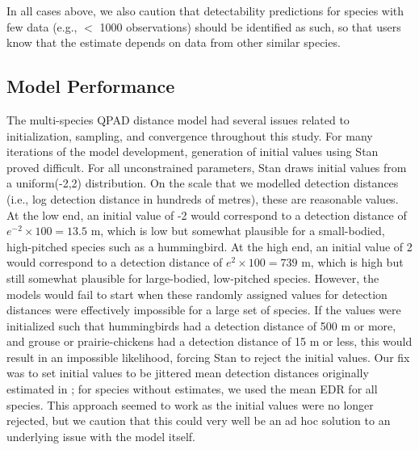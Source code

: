 \documentclass[12pt]{article}
\begin{document}
In all cases above, we also caution that detectability predictions for species with few data (e.g., $<$ 1000 observations) should be identified as such, so that users know that the estimate depends on data from other similar species.


\subsection{Model Performance}

\par The multi-species QPAD distance model had several issues related to initialization, sampling, and convergence throughout this study.
For many iterations of the model development, generation of initial values using Stan proved difficult.
For all unconstrained parameters, Stan draws initial values from a uniform(-2,2) distribution.
On the scale that we modelled detection distances (i.e., log detection distance in hundreds of metres), these are reasonable values.
At the low end, an initial value of -2 would correspond to a detection distance of $e^{-2} \times 100 = 13.5$ m, which is low but somewhat plausible for a small-bodied, high-pitched species such as a hummingbird.
At the high end, an initial value of 2 would correspond to a detection distance of $e^{2} \times 100 = 739$ m, which is high but still somewhat plausible for large-bodied, low-pitched species.
However, the models would fail to start when these randomly assigned values for detection distances were effectively impossible for a large set of species.
If the values were initialized such that hummingbirds had a detection distance of 500 m or more, and grouse or prairie-chickens had a detection distance of 15 m or less, this would result in an impossible likelihood, forcing Stan to reject the initial values.
Our fix was to set initial values to be jittered mean detection distances originally estimated in \citet{edwards_point_2023}; for species without estimates, we used the mean EDR for all species.
This approach seemed to work as the initial values were no longer rejected, but we caution that this could very well be an ad hoc solution to an underlying issue with the model itself.
\end{document}

